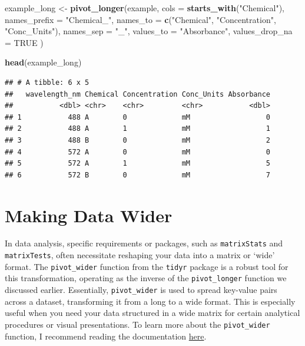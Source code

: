 \documentclass[
]{book}
\newenvironment{Shaded}{\begin{snugshade}}{\end{snugshade}}
\newcommand{\AttributeTok}[1]{\textcolor[rgb]{0.13,0.29,0.53}{#1}}
\newcommand{\ConstantTok}[1]{\textcolor[rgb]{0.56,0.35,0.01}{#1}}
\newcommand{\FunctionTok}[1]{\textcolor[rgb]{0.13,0.29,0.53}{\textbf{#1}}}
\newcommand{\NormalTok}[1]{#1}
\newcommand{\OtherTok}[1]{\textcolor[rgb]{0.56,0.35,0.01}{#1}}
\newcommand{\StringTok}[1]{\textcolor[rgb]{0.31,0.60,0.02}{#1}}
\begin{document}
\begin{Shaded}
\begin{Highlighting}[]
\NormalTok{example\_long }\OtherTok{\textless{}{-}} \FunctionTok{pivot\_longer}\NormalTok{(example,}
   \AttributeTok{cols =} \FunctionTok{starts\_with}\NormalTok{(}\StringTok{"Chemical"}\NormalTok{),}
   \AttributeTok{names\_prefix =} \StringTok{"Chemical\_"}\NormalTok{,}
   \AttributeTok{names\_to =} \FunctionTok{c}\NormalTok{(}\StringTok{"Chemical"}\NormalTok{, }\StringTok{"Concentration"}\NormalTok{, }\StringTok{"Conc\_Units"}\NormalTok{),}
   \AttributeTok{names\_sep =} \StringTok{"\_"}\NormalTok{,}
   \AttributeTok{values\_to =} \StringTok{"Absorbance"}\NormalTok{,}
   \AttributeTok{values\_drop\_na =} \ConstantTok{TRUE}
\NormalTok{ )}

\FunctionTok{head}\NormalTok{(example\_long)}
\end{Highlighting}
\end{Shaded}

\begin{verbatim}
## # A tibble: 6 x 5
##   wavelength_nm Chemical Concentration Conc_Units Absorbance
##           <dbl> <chr>    <chr>         <chr>           <dbl>
## 1           488 A        0             mM                  0
## 2           488 A        1             mM                  1
## 3           488 B        0             mM                  2
## 4           572 A        0             mM                  0
## 5           572 A        1             mM                  5
## 6           572 B        0             mM                  7
\end{verbatim}

\hypertarget{making-data-wider}{%
\section{Making Data Wider}\label{making-data-wider}}

In data analysis, specific requirements or packages, such as \texttt{matrixStats} and \texttt{matrixTests}, often necessitate reshaping your data into a matrix or `wide' format. The \texttt{pivot\_wider} function from the \texttt{tidyr} package is a robust tool for this transformation, operating as the inverse of the \texttt{pivot\_longer} function we discussed earlier. Essentially, \texttt{pivot\_wider} is used to spread key-value pairs across a dataset, transforming it from a long to a wide format. This is especially useful when you need your data structured in a wide matrix for certain analytical procedures or visual presentations. To learn more about the \texttt{pivot\_wider} function, I recommend reading the documentation \href{https://tidyr.tidyverse.org/reference/pivot_wider.html}{here}.
\end{document}
